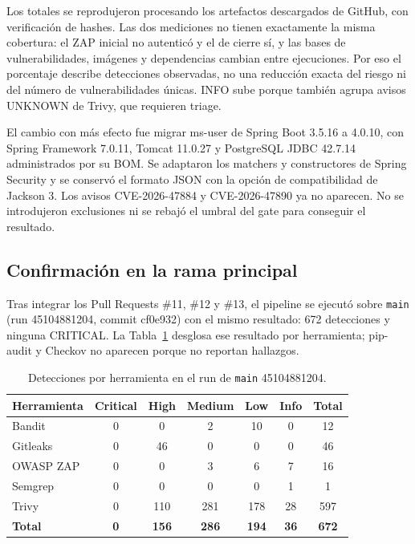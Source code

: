 \documentclass[12pt,a4paper]{article}
\begin{document}
Los totales se reprodujeron procesando los artefactos descargados de GitHub, con verificación de
hashes. Las dos mediciones no tienen exactamente la misma cobertura: el ZAP inicial no autenticó y
el de cierre sí, y las bases de vulnerabilidades, imágenes y dependencias cambian entre ejecuciones.
Por eso el porcentaje describe detecciones observadas, no una reducción exacta del riesgo ni del
número de vulnerabilidades únicas. INFO sube porque también agrupa avisos UNKNOWN de Trivy, que
requieren triage.

El cambio con más efecto fue migrar ms-user de Spring Boot 3.5.16 a 4.0.10, con Spring Framework
7.0.11, Tomcat 11.0.27 y PostgreSQL JDBC 42.7.14 administrados por su BOM. Se adaptaron los
matchers y constructores de Spring Security y se conservó el formato JSON con la opción de
compatibilidad de Jackson 3. Los avisos CVE-2026-47884 y CVE-2026-47890 ya no aparecen. No se
introdujeron exclusiones ni se rebajó el umbral del gate para conseguir el resultado.

\subsection{Confirmación en la rama principal}

Tras integrar los Pull Requests \#11, \#12 y \#13, el pipeline se ejecutó sobre \texttt{main} (run
45104881204, commit cf0e932) con el mismo resultado: 672 detecciones y ninguna CRITICAL. La
Tabla~\ref{tab:main-herramientas} desglosa ese resultado por herramienta; pip-audit y Checkov no
aparecen porque no reportan hallazgos.

\begin{table}[htbp]
  \centering
  \caption{Detecciones por herramienta en el run de \texttt{main} 45104881204.}
  \label{tab:main-herramientas}
  \small
  \begin{tabular}{lcccccc}
    \toprule
    \textbf{Herramienta} & \textbf{Critical} & \textbf{High} & \textbf{Medium} & \textbf{Low} &
    \textbf{Info} & \textbf{Total} \\
    \midrule
    Bandit & 0 & 0 & 2 & 10 & 0 & 12 \\
    Gitleaks & 0 & 46 & 0 & 0 & 0 & 46 \\
    OWASP ZAP & 0 & 0 & 3 & 6 & 7 & 16 \\
    Semgrep & 0 & 0 & 0 & 0 & 1 & 1 \\
    Trivy & 0 & 110 & 281 & 178 & 28 & 597 \\
    \midrule
    \textbf{Total} & \textbf{0} & \textbf{156} & \textbf{286} & \textbf{194} & \textbf{36} &
    \textbf{672} \\
    \bottomrule
  \end{tabular}
\end{table}
\end{document}
